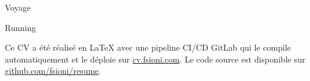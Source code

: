 \documentclass[a4paper,11pt]{article}
\begin{document}
\begin{cv}[profile][2]
\cvseparator
\begin{cvitem}
    Voyage
\end{cvitem}

\cvseparator
\begin{cvitem}
    Running
\end{cvitem}

\cvseparator[12]
\begin{cvitem}[Code][4]
    \small{Ce CV a été réalisé en \LaTeX{} avec une pipeline CI/CD GitLab qui le compile automatiquement et le déploie sur \href{http://cv.fsioni.com}{cv.fsioni.com}. Le code source est disponible sur \href{https://github.com/fsioni/resume}{github.com/fsioni/resume}.}
\end{cvitem}

\end{cv}
\end{document}
